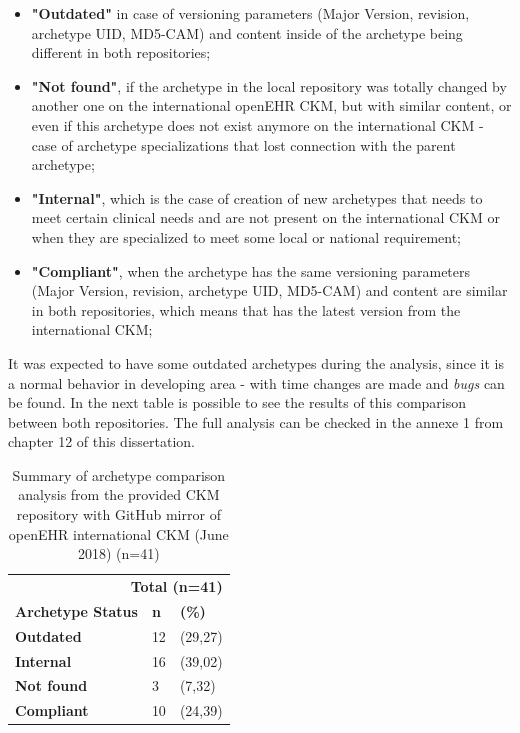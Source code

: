 \documentclass[mim_thesis.tex]{subfiles}
\begin{document}
\begin{itemize}[noitemsep]
\item \textbf{"Outdated"} in case of versioning parameters (Major Version, revision, archetype UID, MD5-CAM) and content inside of the archetype being different in both repositories;
\item \textbf{"Not found"}, if the archetype in the local repository was totally changed by another one on the international openEHR CKM, but with similar content, or even if this archetype does not exist anymore on the international CKM - case of archetype specializations that lost connection with the parent archetype;
\item \textbf{"Internal"}, which is the case of creation of new archetypes that needs to meet certain clinical needs and are not present on the international CKM or when they are specialized to meet some local or national requirement;
\item \textbf{"Compliant"}, when the archetype has the same versioning parameters (Major Version, revision, archetype UID, MD5-CAM) and content are similar in both repositories, which means that has the latest version from the international CKM;
\end{itemize}

It was expected to have some outdated archetypes during the analysis, since it is a normal behavior in developing area - with time changes are made and \textit{bugs} can be found. In the next table is possible to see the results of this comparison between both repositories. The full analysis can be checked in the annexe 1 from chapter 12 of this dissertation.

\begin{table}[H]
	\centering
	\caption{Summary of archetype comparison analysis from the provided CKM repository with GitHub mirror of openEHR international CKM (June 2018) (n=41)}
	\label{tab:repos_comp}
	\begin{tabular}{lll}
		\toprule[2pt]
		\multicolumn{3}{r}{\textbf{ Total (n=41) }} \\
		\cmidrule(r){2-3}
		\textbf{Archetype Status}   & \textbf{n} & \textbf{(\%)} \\
		\midrule[2pt]
		\textbf{Outdated } & 12 & (29,27) \\
		\midrule
		\textbf{Internal } & 16 & (39,02) \\
		\midrule
		\textbf{Not found } & 3 & (7,32) \\
        \midrule
		\textbf{Compliant } & 10 & (24,39) \\
		\bottomrule[2pt]
	\end{tabular}
\end{table}
\end{document}
